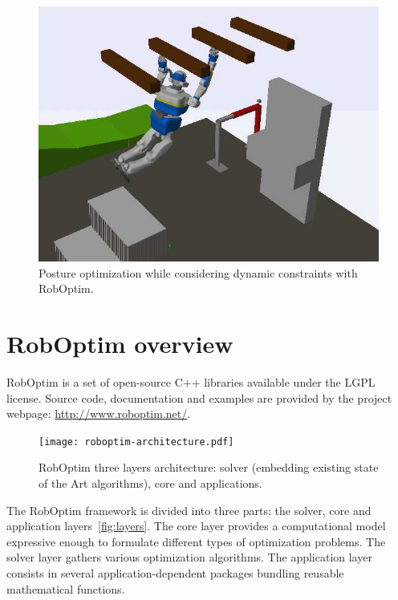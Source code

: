 \documentclass[conference,final,a4paper,twocolumn,9pt]{IEEEtran}
\begin{document}
\begin{figure}[ht!]
  \begin{center}
    \includegraphics[width=\linewidth]{agent-067.jpg}
    \caption{Posture optimization while considering dynamic
      constraints with RobOptim.\label{fig:stence-optimization}}
  \end{center}
\end{figure}



\section{RobOptim overview}\label{sec:roboptim}


RobOptim is a set of open-source C++ libraries avail\-able under the
LGPL license. Source code, documenta\-tion and examples are provided by
the project webpage: \mbox{\url{http://www.roboptim.net/}}.


\begin{figure}
  \begin{center}
    \texttt{[image: roboptim-architecture.pdf]}
  \end{center}
  \caption{RobOptim three layers architecture: solver (embedding
    existing state of the Art algorithms), core and
    applications.}\label{fig:layers}
\end{figure}


The RobOptim framework is divided into three parts: the solver, core
and application layers~\autoref{fig:layers}. The core layer provides a
computational model expressive enough to formulate different types of
optimization problems. The solver layer gathers various optimization
algorithms. The application layer consists in several
application-dependent packages bundling reusable mathematical
functions.
\end{document}
